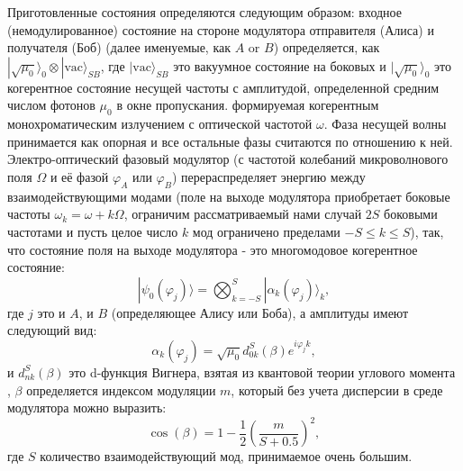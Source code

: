 Приготовленные состояния определяются следующим образом: входное (немодулированное) состояние на стороне модулятора отправителя (Алиса) и получателя (Боб) (далее именуемые, как $A$ or $B$) определяется, как $|\sqrt{\mu_0}\rangle_0\otimes|\mathrm{vac}\rangle_{SB}$, где $|\mathrm{vac}\rangle_{SB}$ это вакуумное состояние на боковых и $|\sqrt{\mu_0}\rangle_0$ это когерентное состояние несущей частоты с амплитудой, определенной средним числом фотонов $\mu_0$ в окне пропускания. формируемая когерентным монохроматическим излучением с оптической частотой $\omega$. Фаза несущей волны принимается как опорная и все остальные фазы считаются по отношению к ней. Электро-оптический фазовый модулятор (с частотой колебаний микроволнового поля $\Omega$ и её фазой $\varphi_A$ или $\varphi_B$) перераспределяет энергию между взаимодействующими модами (поле на выходе модулятора приобретает боковые частоты $\omega_k=\omega+k\Omega$, ограничим рассматриваемый нами случай $2S$ боковыми частотами и пусть целое число $k$ мод ограничено пределами $-S\le k\le S$), так, что состояние поля на выходе модулятора - это многомодовое когерентное состояние: 
%
\begin{equation}\label{phi}
|\psi_0(\varphi_j)\rangle = \bigotimes_{k=-S}^S|{\alpha_k(\varphi_j)}\rangle_k,
\end{equation}
%
где $j$ это и $A$, и $B$ (определяющее Алису или Боба), а амплитуды имеют следующий вид: 
%
\begin{equation}\label{alpha}
\alpha_k(\varphi_j)=\sqrt{\mu_0}d^S_{0k}(\beta)e^{i\varphi_jk},
\end{equation}
%
и $d^S_{nk}(\beta)$ это d-функция Вигнера, взятая из квантовой теории углового момента %
, $\beta$ определяется индексом модуляции $m$, который без учета дисперсии в среде модулятора можно выразить: 
%
\begin{equation}\label{betam}
\cos{({\beta})}=1-\frac{1}{2}{\left(\frac{m}{S+0.5}\right)^2},
\end{equation}
где $S$ количество взаимодействующий мод, принимаемое очень большим.

